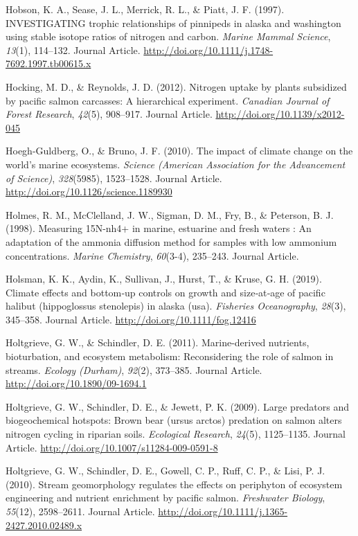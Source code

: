 \documentclass [11pt, proquest] {uwthesis}[2015/03/03]
\begin{document}
\hypertarget{ref-Hobson1997}{}
Hobson, K. A., Sease, J. L., Merrick, R. L., \& Piatt, J. F. (1997).
INVESTIGATING trophic relationships of pinnipeds in alaska and
washington using stable isotope ratios of nitrogen and carbon.
\emph{Marine Mammal Science}, \emph{13}(1), 114--132. Journal Article.
\url{http://doi.org/10.1111/j.1748-7692.1997.tb00615.x}

\hypertarget{ref-Hocking2012}{}
Hocking, M. D., \& Reynolds, J. D. (2012). Nitrogen uptake by plants
subsidized by pacific salmon carcasses: A hierarchical experiment.
\emph{Canadian Journal of Forest Research}, \emph{42}(5), 908--917.
Journal Article. \url{http://doi.org/10.1139/x2012-045}

\hypertarget{ref-Hoegh2010}{}
Hoegh-Guldberg, O., \& Bruno, J. F. (2010). The impact of climate change
on the world's marine ecosystems. \emph{Science (American Association
for the Advancement of Science)}, \emph{328}(5985), 1523--1528. Journal
Article. \url{http://doi.org/10.1126/science.1189930}

\hypertarget{ref-Holmes1998}{}
Holmes, R. M., McClelland, J. W., Sigman, D. M., Fry, B., \& Peterson,
B. J. (1998). Measuring 15N-nh4+ in marine, estuarine and fresh waters :
An adaptation of the ammonia diffusion method for samples with low
ammonium concentrations. \emph{Marine Chemistry}, \emph{60}(3-4),
235--243. Journal Article.

\hypertarget{ref-Holsman2019}{}
Holsman, K. K., Aydin, K., Sullivan, J., Hurst, T., \& Kruse, G. H.
(2019). Climate effects and bottom‐up controls on growth and size‐at‐age
of pacific halibut (hippoglossus stenolepis) in alaska (usa).
\emph{Fisheries Oceanography}, \emph{28}(3), 345--358. Journal Article.
\url{http://doi.org/10.1111/fog.12416}

\hypertarget{ref-Holtgrieve2011}{}
Holtgrieve, G. W., \& Schindler, D. E. (2011). Marine-derived nutrients,
bioturbation, and ecosystem metabolism: Reconsidering the role of salmon
in streams. \emph{Ecology (Durham)}, \emph{92}(2), 373--385. Journal
Article. \url{http://doi.org/10.1890/09-1694.1}

\hypertarget{ref-Holtgrieve2009}{}
Holtgrieve, G. W., Schindler, D. E., \& Jewett, P. K. (2009). Large
predators and biogeochemical hotspots: Brown bear (ursus arctos)
predation on salmon alters nitrogen cycling in riparian soils.
\emph{Ecological Research}, \emph{24}(5), 1125--1135. Journal Article.
\url{http://doi.org/10.1007/s11284-009-0591-8}

\hypertarget{ref-Holtgrieve2010}{}
Holtgrieve, G. W., Schindler, D. E., Gowell, C. P., Ruff, C. P., \&
Lisi, P. J. (2010). Stream geomorphology regulates the effects on
periphyton of ecosystem engineering and nutrient enrichment by pacific
salmon. \emph{Freshwater Biology}, \emph{55}(12), 2598--2611. Journal
Article. \url{http://doi.org/10.1111/j.1365-2427.2010.02489.x}
\end{document}
